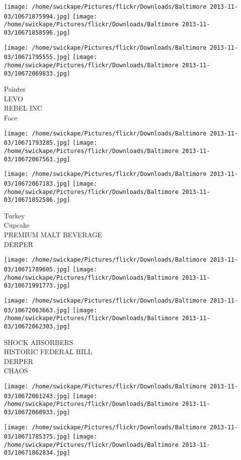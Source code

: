 \documentclass[10pt,letterpaper]{article}
\begin{document}
\texttt{[image: /home/swickape/Pictures/flickr/Downloads/Baltimore 2013-11-03/10671875994.jpg]}
\texttt{[image: /home/swickape/Pictures/flickr/Downloads/Baltimore 2013-11-03/10671858596.jpg]}

\texttt{[image: /home/swickape/Pictures/flickr/Downloads/Baltimore 2013-11-03/10671795555.jpg]}
\texttt{[image: /home/swickape/Pictures/flickr/Downloads/Baltimore 2013-11-03/10672069833.jpg]}

Painter\\
LEVO\\
REBEL INC\\
Face
\pagebreak

\texttt{[image: /home/swickape/Pictures/flickr/Downloads/Baltimore 2013-11-03/10671793285.jpg]}
\texttt{[image: /home/swickape/Pictures/flickr/Downloads/Baltimore 2013-11-03/10672067563.jpg]}

\texttt{[image: /home/swickape/Pictures/flickr/Downloads/Baltimore 2013-11-03/10672067183.jpg]}
\texttt{[image: /home/swickape/Pictures/flickr/Downloads/Baltimore 2013-11-03/10671852586.jpg]}

Turkey\\
Cupcake\\
PREMIUM MALT BEVERAGE\\
DERPER
\pagebreak

\texttt{[image: /home/swickape/Pictures/flickr/Downloads/Baltimore 2013-11-03/10671789605.jpg]}
\texttt{[image: /home/swickape/Pictures/flickr/Downloads/Baltimore 2013-11-03/10671991773.jpg]}

\texttt{[image: /home/swickape/Pictures/flickr/Downloads/Baltimore 2013-11-03/10672063663.jpg]}
\texttt{[image: /home/swickape/Pictures/flickr/Downloads/Baltimore 2013-11-03/10672062303.jpg]}

SHOCK ABSORBERS\\
HISTORIC FEDERAL HILL\\
DERPER\\
CHAOS
\pagebreak

\texttt{[image: /home/swickape/Pictures/flickr/Downloads/Baltimore 2013-11-03/10672061243.jpg]}
\texttt{[image: /home/swickape/Pictures/flickr/Downloads/Baltimore 2013-11-03/10672060933.jpg]}

\texttt{[image: /home/swickape/Pictures/flickr/Downloads/Baltimore 2013-11-03/10671785375.jpg]}
\texttt{[image: /home/swickape/Pictures/flickr/Downloads/Baltimore 2013-11-03/10671862834.jpg]}
\end{document}
